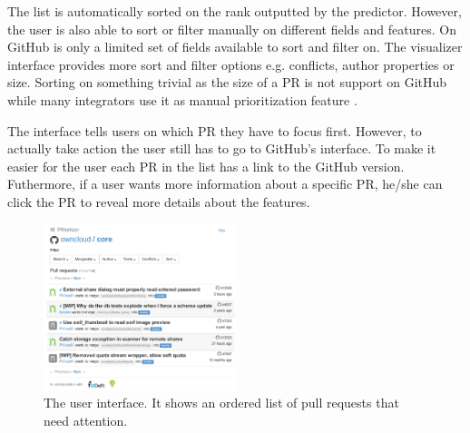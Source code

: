 \begin{description}
The list is automatically sorted on the rank outputted by the predictor.
However, the user is also able to sort or filter manually on different fields and features.
On GitHub is only a limited set of fields available to sort and filter on.
The visualizer interface provides more sort and filter options e.g. conflicts, author properties or size.
Sorting on something trivial as the size of a PR is not support on GitHub while many integrators use it as manual prioritization feature \cite{GZSD15}.

The interface tells users on which PR they have to focus first.
However, to actually take action the user still has to go to GitHub's interface.
To make it easier for the user each PR in the list has a link to the GitHub version.
Futhermore, if a user wants more information about a specific PR, he/she can click the PR to reveal more details about the features.
\end{description}

\begin{figure}
  \centering
  \includegraphics[width=0.5\textwidth]{../figs/interface.pdf}
  \caption[The user interface]
   {The user interface. It shows an ordered list of pull requests that need attention.}
  \label{fig:ui}
\end{figure}
